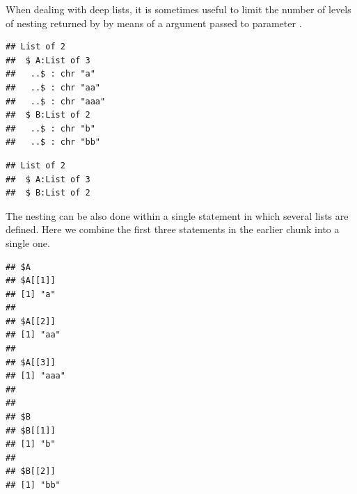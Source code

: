 \documentclass[krantz2]{krantz}\usepackage{knitr}%
\begin{document}
\begin{explainbox}
When dealing with deep lists, it is sometimes useful to limit the number of levels of nesting returned by  by means of a  argument passed to parameter .

\begin{knitrout}\footnotesize
{}\color{fgcolor}\begin{kframe}
\begin{alltt}
\end{alltt}
\begin{verbatim}
## List of 2
##  $ A:List of 3
##   ..$ : chr "a"
##   ..$ : chr "aa"
##   ..$ : chr "aaa"
##  $ B:List of 2
##   ..$ : chr "b"
##   ..$ : chr "bb"
\end{verbatim}
\end{kframe}
\end{knitrout}

\begin{knitrout}\footnotesize
{}\color{fgcolor}\begin{kframe}
\begin{alltt}
  \hlstd{=} \hlstd{)}
\end{alltt}
\begin{verbatim}
## List of 2
##  $ A:List of 3
##  $ B:List of 2
\end{verbatim}
\end{kframe}
\end{knitrout}

\end{explainbox}

The nesting can be also done within a single statement in which several lists are defined. Here we combine the first three statements in the earlier chunk into a single one.

\begin{knitrout}\footnotesize
{}\color{fgcolor}\begin{kframe}
\begin{alltt}
\hlstd{(} \hlstd{=} \hlstd{(}\hlstd{,} \hlstd{,} \hlstd{),}  \hlstd{=} \hlstd{(}\hlstd{,} \hlstd{))}
\end{alltt}
\begin{verbatim}
## $A
## $A[[1]]
## [1] "a"
## 
## $A[[2]]
## [1] "aa"
## 
## $A[[3]]
## [1] "aaa"
## 
## 
## $B
## $B[[1]]
## [1] "b"
## 
## $B[[2]]
## [1] "bb"
\end{verbatim}
\end{kframe}
\end{knitrout}
\end{document}
